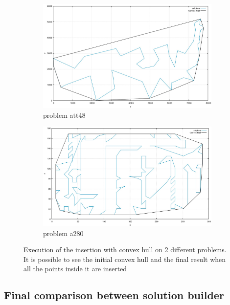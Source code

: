 \begin{figure}[h!]
  \centering
  \begin{subfigure}[b]{0.8\linewidth}
    \includegraphics[width=\linewidth]{media/convex1.jpg}
     \caption{problem att48}
  \end{subfigure}
  \begin{subfigure}[b]{0.8\linewidth}
    \includegraphics[width=\linewidth]{media/convex2.jpg}
    \caption{problem a280}
  \end{subfigure}
  \caption{Execution of the insertion with convex hull on 2 different problems. It is possible to see the initial convex hull and the final result when all the points inside it are inserted}
  \label{fig:insertionHull}
\end{figure}

\subsection{Final comparison between solution builder}

